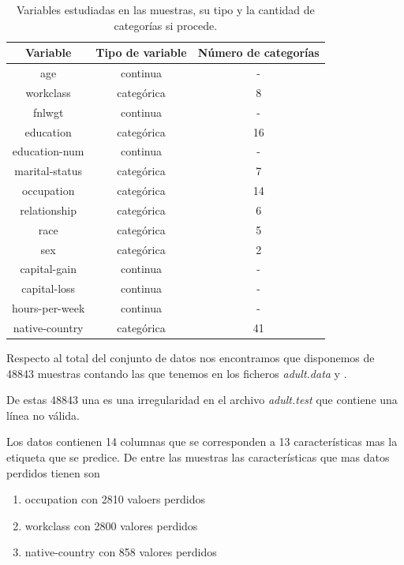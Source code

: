 \documentclass[11pt]{article}
\begin{document}
\begin{table}[h!]
    \centering
    \begin{tabular}{|c|c|c|}
    \hline
    Variable & Tipo de variable & Número de categorías\\ \hline
    age & continua & - \\ \hline
    workclass & categórica & 8 \\ \hline
    fnlwgt & continua & - \\ \hline
    education & categórica & 16 \\ \hline
    education-num & continua & - \\ \hline
    marital-status & categórica & 7 \\ \hline
    occupation & categórica & 14 \\ \hline
    relationship & categórica & 6 \\ \hline
    race & categórica & 5 \\ \hline
    sex & categórica & 2 \\ \hline
    capital-gain & continua & - \\ \hline
    capital-loss & continua & - \\ \hline
    hours-per-week & continua & - \\ \hline
    native-country & categórica & 41 \\ \hline
\end{tabular}
\caption{Variables estudiadas en las muestras, su tipo y la cantidad de categorías si procede.}
\end{table}

Respecto al total del conjunto de datos nos encontramos que disponemos de
48843 muestras contando las que tenemos en los ficheros \textit{adult.data}
y . 

De estas 48843 una es una irregularidad en el archivo \textit{adult.test} que contiene 
una línea no válida.

Los datos contienen 14 columnas que se corresponden a 13 características mas 
la etiqueta que se predice. De entre las muestras las características que mas datos
perdidos tienen son 

\begin{enumerate}
    \item occupation con 2810 valoers perdidos
    \item workclass con 2800 valores perdidos 
    \item native-country con 858 valores perdidos 
\end{enumerate}
\end{document}
